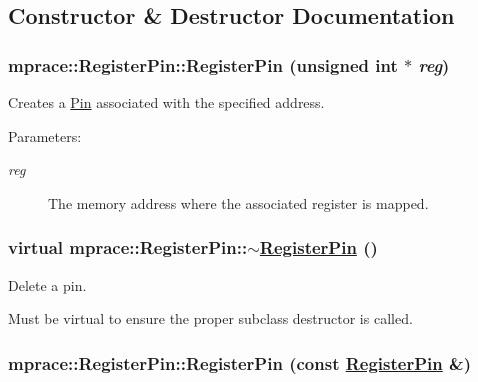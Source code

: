 \subsection{Constructor \& Destructor Documentation}
\hypertarget{classmprace_1_1RegisterPin_a0}{
\subsubsection[RegisterPin]{\setlength{\rightskip}{0pt plus 5cm}mprace::Register\-Pin::Register\-Pin (unsigned int $\ast$ {\em reg})}}
\label{classmprace_1_1RegisterPin_a0}


Creates a \hyperlink{classmprace_1_1Pin}{Pin} associated with the specified address. 

\begin{Desc}
\item[Parameters:]
\begin{description}
\item[{\em reg}]The memory address where the associated register is mapped.\end{description}
\end{Desc}
\hypertarget{classmprace_1_1RegisterPin_a1}{
\subsubsection[$\sim$RegisterPin]{\setlength{\rightskip}{0pt plus 5cm}virtual mprace::Register\-Pin::$\sim$\hyperlink{classmprace_1_1RegisterPin}{Register\-Pin} ()}}
\label{classmprace_1_1RegisterPin_a1}


Delete a pin. 

Must be virtual to ensure the proper subclass destructor is called.\hypertarget{classmprace_1_1RegisterPin_b0}{
\subsubsection[RegisterPin]{\setlength{\rightskip}{0pt plus 5cm}mprace::Register\-Pin::Register\-Pin (const \hyperlink{classmprace_1_1RegisterPin}{Register\-Pin} \&)}}
\label{classmprace_1_1RegisterPin_b0}


